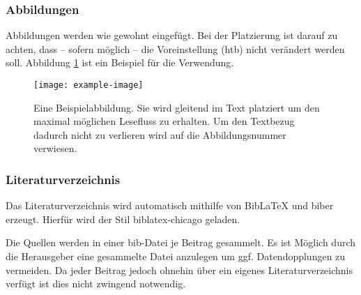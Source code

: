 \subsubsection{Abbildungen}
Abbildungen werden wie gewohnt eingefügt. Bei der Platzierung ist darauf zu achten, dass – sofern möglich – die Voreinstellung (htb) nicht verändert werden soll.
Abbildung \ref{fig:example-image} ist ein Beispiel für die Verwendung. 

\begin{figure}
	\centering
	\texttt{[image: example-image]}
	\caption{Eine Beispielabbildung. Sie wird gleitend im Text platziert um den maximal möglichen Lesefluss zu erhalten. Um den Textbezug dadurch nicht zu verlieren wird auf die Abbildungsnummer verwiesen.}
	\label{fig:example-image}
\end{figure}


\subsubsection{Literaturverzeichnis}

Das Literaturverzeichnis wird automatisch mithilfe von BibLaTeX und biber erzeugt. Hierfür wird der Stil biblatex-chicago geladen. 

Die Quellen werden in einer bib-Datei je Beitrag gesammelt. Es ist Möglich durch die Herausgeber eine gesammelte Datei anzulegen um ggf. Datendopplungen zu vermeiden. Da jeder Beitrag jedoch ohnehin über ein eigenes Literaturverzeichnis verfügt ist dies nicht zwingend notwendig. 


\printbibliography